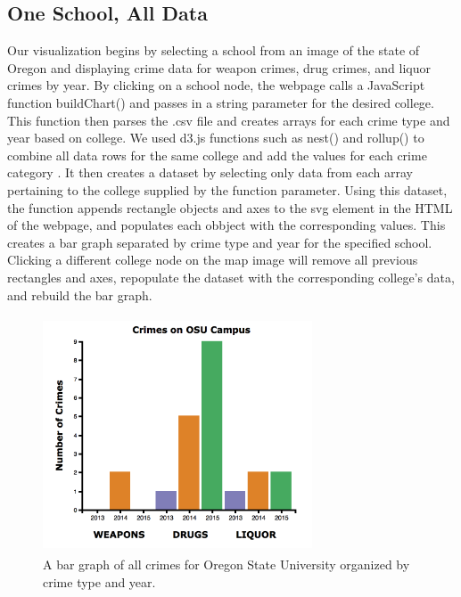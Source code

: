 \documentclass[journal]{vgtc}                %
\begin{document}
\subsection{One School, All Data}
Our visualization begins by selecting a school from an image of the state of Oregon and displaying crime data for weapon crimes, drug crimes, and liquor crimes by year. By clicking on a school node, the webpage calls a JavaScript function buildChart() and passes in a string parameter for the desired college. This function then parses the .csv file and creates arrays for each crime type and year based on college. We used d3.js functions such as nest() and rollup() to combine all data rows for the same college and add the values for each crime category \cite{d3API}.
It then creates a dataset by selecting only data from each array pertaining to the college supplied by the function parameter. Using this dataset, the function appends rectangle objects and axes to the svg element in the HTML of the webpage, and populates each obbject with the corresponding values. This creates a bar graph separated by crime type and year for the specified school. Clicking a different college node on the map image will remove all previous rectangles and axes, repopulate the dataset with the corresponding college's data, and rebuild the bar graph. 
\begin{figure}[H]
\label{fig:OneSchoolAllData} 
\includegraphics[width=8cm, height=7cm]{OneSchoolAllData}
\caption{A bar graph of all crimes for Oregon State University organized by crime type and year.}
\end{figure}
\end{document}
